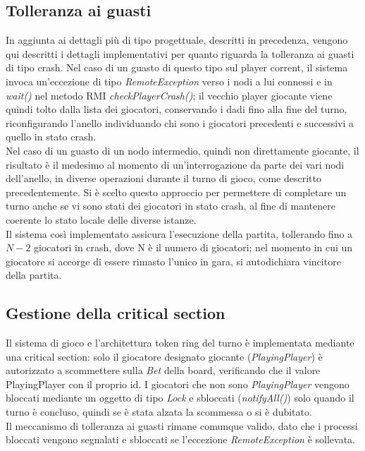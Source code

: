 \documentclass{llncs}
\begin{document}
			
\subsection{Tolleranza ai guasti}
In aggiunta ai dettagli più di tipo progettuale, descritti in precedenza, vengono qui descritti i dettagli implementativi per quanto riguarda la tolleranza ai guasti di tipo crash.
	Nel caso di un guasto di questo tipo sul player corrent, il
	sistema invoca un'eccezione di tipo \textit{RemoteException} verso
	i nodi a lui connessi e in \textit{wait()} nel metodo RMI \textit{checkPlayerCrash()}; il vecchio player giocante viene quindi tolto dalla lista dei giocatori, conservando i dadi fino alla fine del turno, riconfigurando l'anello individuando chi sono i giocatori precedenti e successivi a quello in stato crash.\\
	Nel caso di un guasto di un nodo intermedio, quindi non direttamente giocante, il risultato è il
	medesimo al momento di un'interrogazione da parte dei vari nodi
	dell'anello, in diverse operazioni durante il turno di gioco, come descritto precedentemente.
	Si è scelto questo approccio per permettere di completare un turno anche se vi sono stati dei giocatori in stato crash, al fine di mantenere coerente lo stato locale delle
	diverse istanze.\\
Il sistema così implementato assicura l'esecuzione della partita, tollerando fino a $N-2$ giocatori in crash, dove N è il numero di giocatori; nel momento in cui un giocatore si accorge di essere rimasto l'unico in gara, si autodichiara vincitore della partita.

\subsection{Gestione della critical section}

Il sistema di gioco e l'architettura token ring del turno è implementata mediante una critical section: solo il giocatore designato giocante (\textit{PlayingPlayer}) è autorizzato a scommettere sulla \textit{Bet} della board, verificando che il valore PlayingPlayer con il proprio id. I giocatori che non sono \textit{PlayingPlayer} vengono bloccati mediante un oggetto di tipo \textit{Lock} e sbloccati (\textit{notifyAll()}) solo quando il turno è concluso, quindi se è stata alzata la scommessa o si è dubitato.\\
Il meccanismo di tolleranza ai guasti rimane comunque valido, dato che i processi bloccati vengono segnalati e sbloccati se l'eccezione \textit{RemoteException} è sollevata.
			
\end{document}

